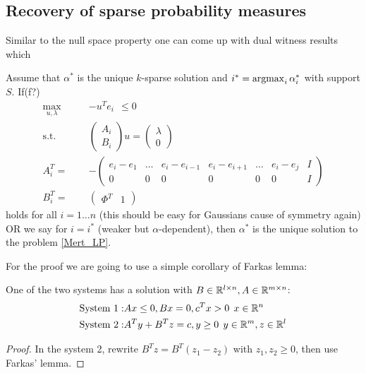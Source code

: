 \documentclass{article} %
\newcommand{\RN}{\R}
\begin{document}
\subsection{Recovery of sparse probability measures}

Similar to the null space property one can come up with dual witness results which 
\begin{theorem}
\label{Maxmax_Oneblock}
Assume that $\alpha^*$ is the unique $k$-sparse solution and $i^* = \operatorname{argmax}_i \alpha^*_i$ with support $S$. If(f?)
\begin{align*}
\label{Maxrecovery_condition_Farkas}
\max_{u,\lambda} \qquad &- u^T e_i \:\: \leq 0\\
\text{s.t.} \qquad& \begin{pmatrix} A_i\\ B_i \end{pmatrix} u = \begin{pmatrix} \lambda \\ 0\end{pmatrix}\\
A_i^T = &-\begin{pmatrix} e_i - e_{1} & \dots & e_i - e_{i-1} & e_i - e_{i+1} & \dots & e_i - e_j & I\\
0 & 0 & 0&0&0&0& I
\end{pmatrix}\\
B_i^T = &\begin{pmatrix} \Phi^T & 1\end{pmatrix} 
\end{align*}
holds for all $i = 1\dots n$ (this should be easy for Gaussians cause of symmetry again) OR we say for $i = i^*$ (weaker but $\alpha$-dependent), then $\alpha^*$ is the unique solution to the problem \eqref{Mert_LP}.
\end{theorem}
For the proof we are going to use a simple corollary of Farkas lemma:
\begin{lemma}
\label{Farkas_Corollary}
One of the two systems has a solution with $B \in \RN^{l\times n}, A\in \RN^{m\times n}$:
\begin{align*}
\text{System 1}: & Ax \leq 0, Bx = 0, c^Tx >0\:\: x\in \RN^n\\
\text{System 2}: & A^T y + B^T z = c, y\geq 0\:\: y\in \RN^m, z\in \RN^l
\end{align*}
\end{lemma}
\begin{proof}
In the system 2, rewrite $B^T z = B^T (z_1 - z_2)$ with $z_1,z_2 \geq 0$, then use Farkas' lemma. 
\end{proof}
\end{document}
